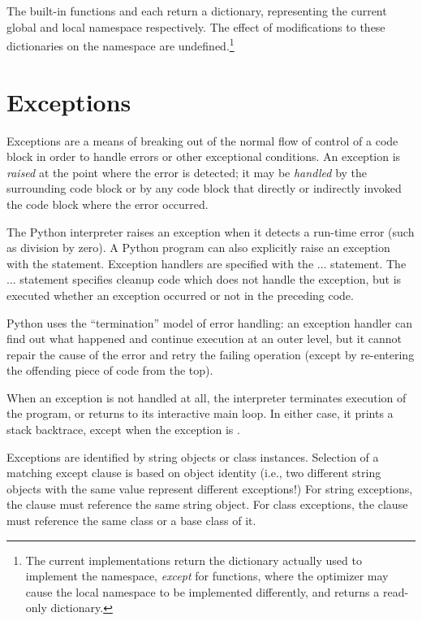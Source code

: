 The built-in functions  and 
each return a dictionary, representing the current global and local
namespace respectively.  The effect of modifications to these
dictionaries on the namespace are undefined.\footnote{
  The current implementations return the dictionary actually used to
  implement the namespace, \emph{except} for functions, where the
  optimizer may cause the local namespace to be implemented
  differently, and  returns a read-only
  dictionary.}


\section{Exceptions \label{exceptions}}

Exceptions are a means of breaking out of the normal flow of control
of a code block in order to handle errors or other exceptional
conditions.  An exception is
\emph{raised} at the point where the error
is detected; it may be \emph{handled} by
the surrounding code block or by any code block that directly or
indirectly invoked the code block where the error occurred.

The Python interpreter raises an exception when it detects a run-time
error (such as division by zero).  A Python program can also
explicitly raise an exception with the  statement.
Exception handlers are specified with the  ... 
statement.  The  ...  statement
specifies cleanup code which does not handle the exception, but is
executed whether an exception occurred or not in the preceding code.

Python uses the ``termination'' model of
error handling: an exception handler can find out what happened and
continue execution at an outer level, but it cannot repair the cause
of the error and retry the failing operation (except by re-entering
the offending piece of code from the top).

When an exception is not handled at all, the interpreter terminates
execution of the program, or returns to its interactive main loop.  In
either case, it prints a stack backtrace, except when the exception is 
.

Exceptions are identified by string objects or class instances.
Selection of a matching except clause is based on object identity
(i.e., two different string objects with the same value represent
different exceptions!)  For string exceptions, the 
clause must reference the same string object.  For class exceptions,
the  clause must reference the same class or a base
class of it.

